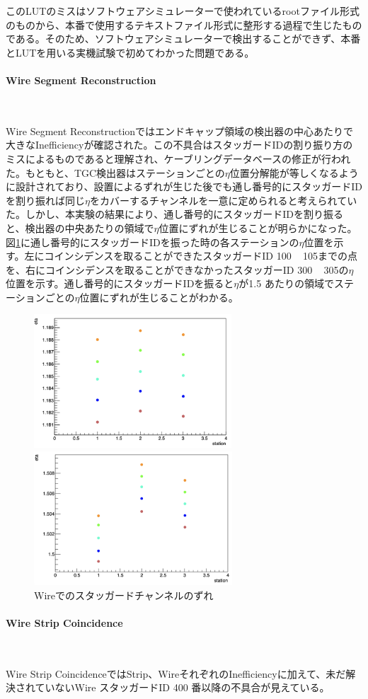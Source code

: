 このLUTのミスはソフトウェアシミュレーターで使われているrootファイル形式のものから、本番で使用するテキストファイル形式に整形する過程で生じたものである。そのため、ソフトウェアシミュレーターで検出することができず、本番とLUTを用いる実機試験で初めてわかった問題である。

\paragraph{Wire Segment Reconstruction}　　
\par
Wire Segment Reconstructionではエンドキャップ領域の検出器の中心あたりで大きなInefficiencyが確認された。この不具合はスタッガードIDの割り振り方のミスによるものであると理解され、ケーブリングデータベースの修正が行われた。もともと、TGC検出器はステーションごとの$\eta$位置分解能が等しくなるように設計されており、設置によるずれが生じた後でも通し番号的にスタッガードIDを割り振れば同じ$\eta$をカバーするチャンネルを一意に定められると考えられていた。しかし、本実験の結果により、通し番号的にスタッガードIDを割り振ると、検出器の中央あたりの領域で$\eta$位置にずれが生じることが明らかになった。図\ref{Stag300}に通し番号的にスタッガードIDを振った時の各ステーションの$\eta$位置を示す。左にコインシデンスを取ることができたスタッガードID 100 ~ 105までの点を、右にコインシデンスを取ることができなかったスタッガーID 300 ~ 305の$\eta$位置を示す。通し番号的にスタッガードIDを振ると$\eta$が1.5 あたりの領域でステーションごとの$\eta$位置にずれが生じることがわかる。

\begin{figure}
\begin{minipage}[b]{.5\linewidth}
\centering
\includegraphics[height=5cm]{fig/Test/Stag100-105.png}
\end{minipage}%
\begin{minipage}[b]{.5\linewidth}
\centering
\includegraphics[height=5cm]{fig/Test/Stag300-305.png}
\end{minipage}%
\caption[Wireでのスタッガードチャンネルのずれ]{Wireでのスタッガードチャンネルのずれ}
\label{Stag300}
\end{figure}

\paragraph{Wire Strip Coincidence}　　
\par
Wire Strip CoincidenceではStrip、WireそれぞれのInefficiencyに加えて、未だ解決されていないWire スタッガードID 400 番以降の不具合が見えている。